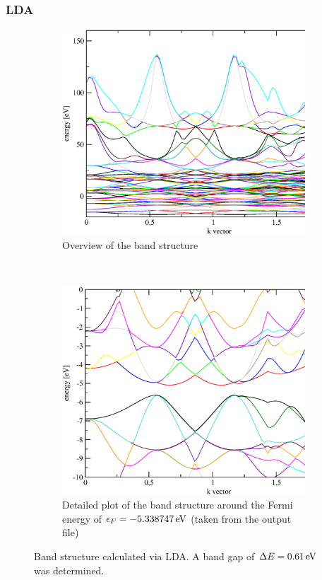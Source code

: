 \documentclass[12pt,a4paper]{scrartcl}
\begin{document}
\subsubsection{LDA}

\begin{figure}[H]
        \begin{subfigure}[a]{0.7\textwidth}
			\includegraphics[width=\linewidth]{./plots/LDA_all.eps}
    		\caption[LDA: band structure]{Overview of the band structure}
		\end{subfigure}
		~
        \begin{subfigure}[a]{0.7\textwidth}
			\includegraphics[width=\linewidth]{./plots/LDA_gap.eps}
    		\caption[LDA: band gap]{Detailed plot of the band structure around the Fermi energy of $\epsilon_F = \unit[-5.338747]{eV}$ (taken from the output file)}
		\end{subfigure}
        \caption{Band structure calculated via LDA. A band gap of $\Delta E = \unit[0.61]{eV}$ was determined.}
        \label{fig:bandLDA}
\end{figure}
\end{document}
